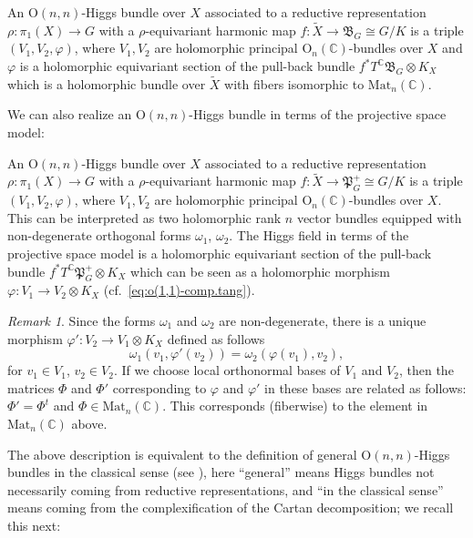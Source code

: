 \documentclass[oneside,11pt]{amsart}
\theoremstyle{definition}
\theoremstyle{remark}
\newtheorem{rem}[thm]{Remark}
\numberwithin{thm}{section}
\numberwithin{equation}{section}
\begin{document}
    An $\mathrm{O}(n,n)$-Higgs bundle over $X$ associated to a reductive representation $\rho\colon \pi_1(X)\to G$ with a $\rho$-equivariant harmonic map $f\colon\tilde X\to \mathfrak B_G\cong G/K$ is a triple $(V_1,V_2,\varphi)$, where $V_1,V_2$ are holomorphic principal $\mathrm{O}_n(\mathbb C)$-bundles over $X$ and $\varphi$ is a holomorphic equivariant section of the pull-back bundle $f^*T^\mathbb C\mathfrak B_G\otimes K_X$ which is a holomorphic bundle over $\tilde X$ with fibers isomorphic to $\mathrm{Mat}_n(\mathbb C)$.

\noindent We can also realize an $\mathrm{O}(n,n)$-Higgs bundle in terms of the projective space model:


    An $\mathrm{O}(n,n)$-Higgs bundle over $X$ associated to a reductive representation $\rho\colon \pi_1(X)\to G$ with a $\rho$-equivariant harmonic map $f\colon\tilde X\to \mathfrak P_G^+\cong G/K$ is a triple $(V_1,V_2,\varphi)$, where $V_1,V_2$ are holomorphic principal $\mathrm{O}_n(\mathbb C)$-bundles over $X$. This can be interpreted as two holomorphic rank $n$ vector bundles equipped with non-degenerate orthogonal forms $\omega_1$, $\omega_2$. The Higgs field in terms of the projective space model is a holomorphic equivariant section of the pull-back bundle $f^*T^\mathbb C\mathfrak P_G^+\otimes K_X$ which can be seen as a holomorphic morphism $\varphi\colon V_1\to V_2\otimes K_X$ (cf.~\eqref{eq:o(1,1)-comp.tang}).


\begin{rem}
    Since the forms $\omega_1$ and $\omega_2$ are non-degenerate, there is a unique morphism $\varphi'\colon V_2\to V_1\otimes K_X$ defined as follows
   \begin{equation}\label{eq:o(n,n)-higgs}
   \omega_1(v_1,\varphi'(v_2))=\omega_2(\varphi(v_1),v_2),   
   \end{equation}
   for $v_1\in V_1$, $v_2\in V_2$. 
    If we choose local orthonormal bases of $V_1$ and $V_2$, then the matrices $\Phi$ and $\Phi'$ corresponding to $\varphi$ and $\varphi'$ in these bases are related as follows: $\Phi'=\Phi^t$ and $\Phi\in\mathrm{Mat}_n(\mathbb C)$. This corresponds (fiberwise) to the element in $\mathrm{Mat}_n(\mathbb C)$ above.
\end{rem}

The above description is equivalent to the definition of general $\mathrm{O}(n,n)$-Higgs bundles in the classical sense (see \cite[Section 2]{ABCGPGO}), here ``general'' means Higgs bundles not necessarily coming from reductive representations, and ``in the classical sense'' means coming from the complexification of the Cartan decomposition; we recall this next:
\end{document}
